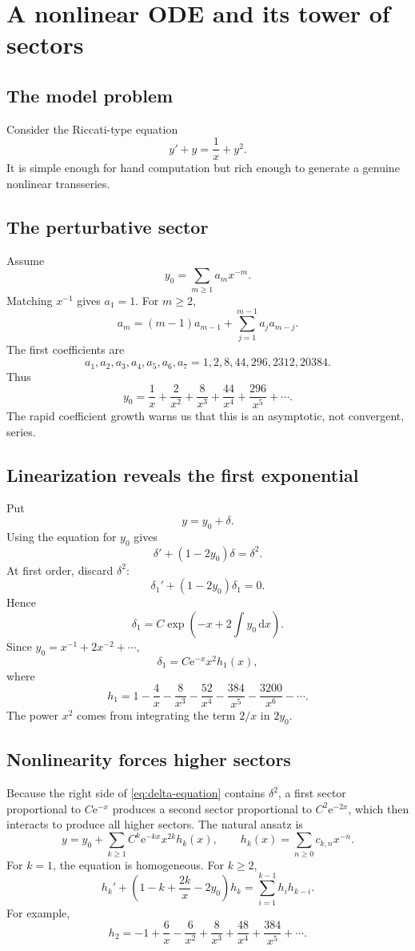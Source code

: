 \documentclass[11pt,openany]{book}
\theoremstyle{plain}
\theoremstyle{definition}
\theoremstyle{remark}
\newcommand{\dd}{\,\mathrm{d}}
\newcommand{\e}{\mathrm{e}}
\begin{document}
\chapter{A nonlinear ODE and its tower of sectors}
\label{chap:nonlinearODE}

\section{The model problem}
Consider the Riccati-type equation
\[
  y'+y=\frac1x+y^2.
  \label{eq:riccati-model}
\]
It is simple enough for hand computation but rich enough to generate a genuine nonlinear transseries.

\section{The perturbative sector}
Assume
\[
  y_0=\sum_{m\ge1}a_mx^{-m}.
\]
Matching $x^{-1}$ gives $a_1=1$. For $m\ge2$,
\[
  a_m=(m-1)a_{m-1}
  +\sum_{j=1}^{m-1}a_ja_{m-j}.
  \label{eq:riccati-recurrence}
\]
The first coefficients are
\[
  a_1,a_2,a_3,a_4,a_5,a_6,a_7
  =1,2,8,44,296,2312,20384.
\]
Thus
\[
  y_0=\frac1x+\frac2{x^2}+\frac8{x^3}
      +\frac{44}{x^4}+\frac{296}{x^5}+\cdots.
\]
The rapid coefficient growth warns us that this is an asymptotic, not convergent, series.

\section{Linearization reveals the first exponential}
Put
\[
  y=y_0+\delta.
\]
Using the equation for $y_0$ gives
\[
  \delta'+(1-2y_0)\delta=\delta^2.
  \label{eq:delta-equation}
\]
At first order, discard $\delta^2$:
\[
  \delta_1'+(1-2y_0)\delta_1=0.
\]
Hence
\[
  \delta_1=C\exp\left(-x+2\int y_0\dd x\right).
\]
Since $y_0=x^{-1}+2x^{-2}+\cdots$,
\[
  \delta_1=C\e^{-x}x^2h_1(x),
\]
where
\[
  h_1=1-\frac4x-\frac8{x^3}
      -\frac{52}{x^4}-\frac{384}{x^5}
      -\frac{3200}{x^6}-\cdots.
\]
The power $x^2$ comes from integrating the term $2/x$ in $2y_0$.

\section{Nonlinearity forces higher sectors}
Because the right side of \cref{eq:delta-equation} contains $\delta^2$, a first sector proportional to $C\e^{-x}$ produces a second sector proportional to $C^2\e^{-2x}$, which then interacts to produce all higher sectors. The natural ansatz is
\[
  y=y_0+
  \sum_{k\ge1}C^k\e^{-kx}x^{2k}h_k(x),
  \qquad
  h_k(x)=\sum_{n\ge0}c_{k,n}x^{-n}.
  \label{eq:riccati-transseries}
\]
For $k=1$, the equation is homogeneous. For $k\ge2$,
\[
 h_k'+\left(1-k+\frac{2k}{x}-2y_0\right)h_k
 =\sum_{i=1}^{k-1}h_i h_{k-i}.
 \label{eq:sector-recurrence}
\]
For example,
\[
  h_2=-1+\frac6x-\frac6{x^2}
      +\frac8{x^3}+\frac{48}{x^4}
      +\frac{384}{x^5}+\cdots.
\]
\end{document}
